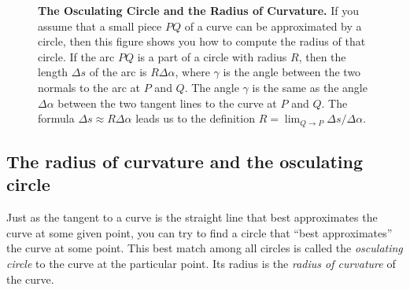 \begin{figure}[ht]
  \centering 
  \caption{\textbf{The Osculating Circle and the Radius of
      Curvature. } If you assume that a small piece $PQ$ of a curve
    can be approximated by a circle, then this figure shows you how to
    compute the radius of that circle.  If the arc $PQ$ is a part of a
    circle with radius $R$, then the length $\Delta s$ of the arc is
    $R \Delta\alpha$, where $\gamma$ is the angle between the two
    normals to the arc at $P$ and $Q$.  The angle $\gamma$ is the same
    as the angle $\Delta \alpha$ between the two tangent lines to the
    curve at $P$ and $Q$.  The formula $\Delta s \approx R\Delta
    \alpha$ leads us to the definition $R = \lim_{Q\to P} \Delta
    s/\Delta\alpha$.}
  \label{fig:05osculating-circle}
\end{figure}

\subsection{The radius of curvature and the osculating circle}
\label{sec:radius-curvature-osculating-circle}
Just as the tangent to a curve is the straight line that best approximates the
curve at some given point, you can try to find a circle that ``best
approximates'' the curve at some point.  This best match among all circles is
called the \emph{osculating circle} to the curve at the particular point.  Its
radius is the \emph{radius of curvature} of the curve.

